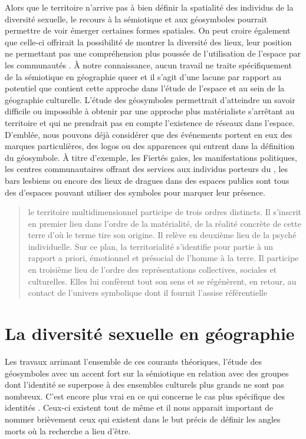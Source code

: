 Alors que le territoire n'arrive pas à bien définir la spatialité des individus de la diversité sexuelle, le recours à la sémiotique et aux géosymboles pourrait permettre de voir émerger certaines formes spatiales.
On peut croire également que celle-ci offrirait la possibilité de montrer la diversité des lieux, leur position ne permettant pas une compréhension plus poussée de l'utilisation de l'espace par les communautés \lgbt{}.
À notre connaissance, aucun travail ne traite spécifiquement de la sémiotique en géographie queer et il s'agit d'une lacune par rapport au potentiel que contient cette approche dans l'étude de l'espace et au sein de la géographie culturelle.
L'étude des géosymboles permettrait d'atteindre un savoir difficile ou impossible à obtenir par une approche plus matérialiste s'arrêtant au territoire et qui ne prendrait pas en compte l'existence de réseaux dans l'espace.
D'emblée, nous pouvons déjà considérer que des événements portent en eux des marques particulières, des logos ou des apparences qui entrent dans la définition du géosymbole.
À titre d'exemple, les Fiertés gaies, les manifestations politiques, les centres communautaires offrant des services aux individus porteurs du \vih, les bars lesbiens ou encore des lieux de dragues dans des espaces publics sont tous des d'espaces \lgbt{} pouvant utiliser des symboles pour marquer leur présence.

\blockquote[{\cite[108]{DiMeo1998}}][.]{\textelp{} le territoire multidimensionnel participe de trois ordres distincts. Il s'inscrit en premier lieu dans l'ordre de la matérialité, de la réalité concrète de cette terre d'où le terme tire son origine. Il relève en deuxième lieu de la psyché individuelle.
Sur ce plan, la territorialité s'identifie pour partie à un rapport a priori, émotionnel et présocial de l'homme à la terre. Il participe en troisième lieu de l'ordre des représentations collectives, sociales et culturelles. Elles lui confèrent tout son sens et se régénèrent, en retour, au contact de l'univers symbolique dont il fournit l'assise référentielle}.

\section{La diversité sexuelle en géographie}
\label{sec:la_diversit_sexuelle_en_g_ographie}

Les travaux arrimant l'ensemble de ces courants théoriques, l'étude des géosymboles avec un accent fort sur la sémiotique en relation avec des groupes dont l'identité se superpose à des ensembles culturels plus grands ne sont pas nombreux.
C'est encore plus vrai en ce qui concerne le cas plus spécifique des identités \lgbt{}.
Ceux-ci existent tout de même et il nous apparait important de nommer brièvement ceux qui existent dans le but précis de définir les angles morts où la recherche a lieu d'être.

